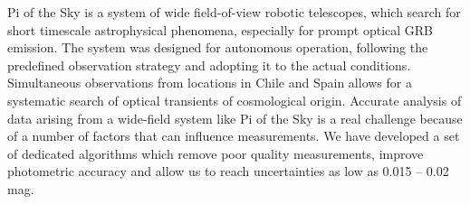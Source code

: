 


\bigskip



\bigskip

\noindent Pi of the Sky is a system of  wide field-of-view  robotic telescopes, which search for short timescale astrophysical phenomena, especially for prompt optical GRB emission. The system was designed for autonomous operation, following the predefined observation strategy and adopting it to the actual conditions. Simultaneous observations from locations in Chile and Spain allows for a systematic search of optical transients of cosmological origin.
Accurate analysis of data arising from a wide-field system like Pi of the Sky  is a real challenge because of a number of factors that can influence measurements. We have developed a set of dedicated algorithms which remove poor quality measurements, improve photometric accuracy and allow us to reach uncertainties  as low as 0.015 – 0.02 mag.

